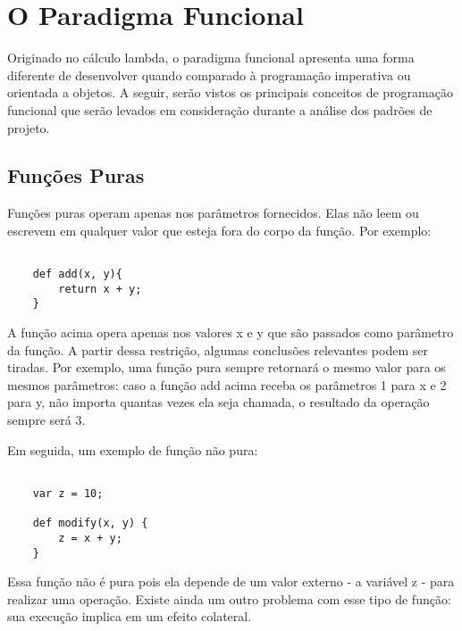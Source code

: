 \chapter{O Paradigma Funcional}

Originado no cálculo lambda, o paradigma funcional 
apresenta uma forma diferente de desenvolver quando 
comparado à programação imperativa ou orientada a 
objetos. A seguir, serão vistos os principais 
conceitos de programação funcional que serão 
levados em consideração durante a análise dos 
padrões de projeto.

\section{Funções Puras}

Funções puras operam apenas nos parâmetros fornecidos. 
Elas não leem ou escrevem em qualquer valor que esteja 
fora do corpo da função\cite{purefunctionscala, functionalscala}. Por exemplo:

\begin{lstlisting}[caption={Exemplo de Função Pura},label=purefunction]

    def add(x, y){
        return x + y;
    }

\end{lstlisting}

A função acima opera apenas nos valores x e y que 
são passados como parâmetro da função. A partir 
dessa restrição, algumas conclusões relevantes podem 
ser tiradas. Por exemplo, uma função pura sempre 
retornará o mesmo valor para os mesmos parâmetros: 
caso a função add acima receba os parâmetros 1 para x 
e 2 para y, não importa quantas vezes ela seja chamada, 
o resultado da operação sempre será 3\cite{functionalscala}.

Em seguida, um exemplo de função não pura:

\begin{lstlisting}[caption={Exemplo de Função Pura},label=impurefunction]

    var z = 10;

    def modify(x, y) {
        z = x + y;
    }

\end{lstlisting}

Essa função não é pura pois ela depende de um 
valor externo - a variável z - para realizar 
uma operação. Existe ainda um outro problema 
com esse tipo de função: sua execução implica em 
um efeito colateral.

